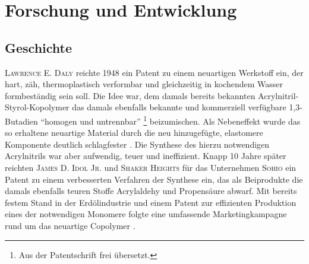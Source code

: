 \chapter{Forschung und Entwicklung}
    \section{Geschichte}\label{sec:geschichte}
        \textsc{Lawrence E. Daly} reichte 1948 ein Patent zu einem neuartigen Werkstoff ein, der hart, zäh, thermoplastisch verformbar
        und gleichzeitig in kochendem Wasser formbeständig sein soll. Die Idee war, dem damals bereits bekannten Acrylnitril-Styrol-Kopolymer
        das damals ebenfalls bekannte und kommerziell verfügbare 1,3-Butadien \enquote{homogen und untrennbar} \footnote{Aus der Patentschrift frei übersetzt.}
        beizumischen. Als Nebeneffekt wurde das so erhaltene neuartige Material durch die neu hinzugefügte, elastomere Komponente
        deutlich schlagfester \cite{ABS.patent.1948.Daly.10191946}.
        \medskip
        Die Synthese des hierzu notwendigen Acrylnitrils war aber aufwendig, teuer und ineffizient. Knapp 10 Jahre später
        reichten \textsc{James D. Idol Jr.} und \textsc{Shaker Heights} für das Unternehmen \textsc{Sohio} ein Patent zu einem verbesserten Verfahren
        der Synthese ein, das als Beiprodukte die damals ebenfalls teuren Stoffe Acrylaldehy und Propensäure abwarf. Mit
        bereits festem Stand in der Erdölindustrie und einem Patent zur effizienten Produktion eines der notwendigen Monomere        
        folgte eine umfassende Marketingkampagne rund um das neuartige Copolymer \cite{history.of.sohio.process.booklet.2021,sohio.process.patent.1959.9201957}.
        
